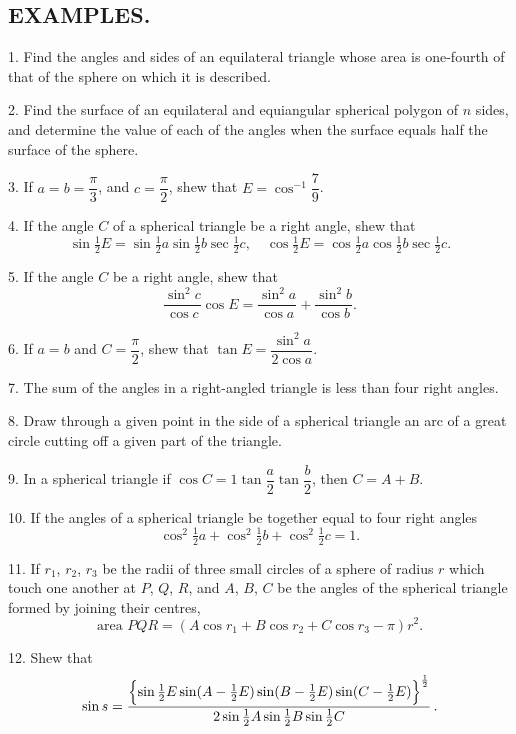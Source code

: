 \documentclass{book}[2004/02/16]
\begin{document}
\begin{mainmatter}
\begin{spacing}{1.3}
\section*{\centering\normalsize EXAMPLES.}

1. Find the angles and sides of an equilateral triangle whose
area is one-fourth of that of the sphere on which it is described.
\medskip

2. Find the surface of an equilateral and equiangular spherical
polygon of $n$ sides, and determine the value of each of the
angles when the surface equals half the surface of the sphere.
\medskip

3. If $a=b=\dfrac{\pi}{3}$, and $c=\dfrac{\pi}{2}$, shew that $E=\cos^{-1}\dfrac{7}{9}$.
\medskip

4. If the angle $C$ of a spherical triangle be a right angle,
shew that
\[
\sin \tfrac{1}{2} E= \sin \tfrac{1}{2} a \sin \tfrac{1}{2} b \sec \tfrac{1}{2} c, \quad
\cos \tfrac{1}{2} E= \cos \tfrac{1}{2} a \cos \tfrac{1}{2} b \sec \tfrac{1}{2} c.
\]

5. If the angle $C$ be a right angle, shew that
\[
\frac{\sin^2 c}{\cos c}\cos E= \frac{\sin^2 a}{\cos a}+\frac{\sin^2 b}{\cos b}.
\]

6. If $a=b$ and $C=\dfrac{\pi}{2}$, shew that $\tan E=\dfrac{\sin^2 a}{2\cos a}$.
\medskip

7. The sum of the angles in a right-angled triangle is less
than four right angles.
\medskip

8. Draw through a given point in the side of a spherical
triangle an arc of a great circle cutting off a given part of the
triangle.
\medskip

9. In a spherical triangle if $\cos C=1\tan\dfrac{a}{2}\tan\dfrac{b}{2}$, then
$C=A+B$.
\medskip

10. If the angles of a spherical triangle be together equal to
four right angles
\[
  \cos^2\tfrac{1}{2}a + \cos^2\tfrac{1}{2}b + \cos^2\tfrac{1}{2}c = 1.
\]

11. If $r_1$, $r_2$, $r_3$ be the radii of three small circles of a
sphere of radius $r$ which touch one another at $P$, $Q$, $R$, and
$A$, $B$, $C$ be the angles of the spherical triangle formed by joining
their centres,
\[
\text{area }PQR = (A\cos r_1 + B\cos r_2 + C\cos r_3 - \pi)r^2.
\]

12. Shew that
\[
\sin s
= \frac{\Bigl\{\sin\frac{1}{2}E \sin(A-\frac{1}{2}E)
         \sin(B-\frac{1}{2}E) \sin(C-\frac{1}{2}E)
         \Bigr\}^{\frac{1}{2}} }
       {2\sin\frac{1}{2}A \sin\frac{1}{2}B \sin\frac{1}{2}C } \,.
\]


\end{spacing}
\end{mainmatter}
\end{document}
